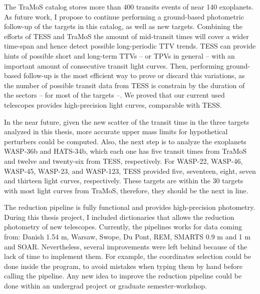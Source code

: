 The TraMoS catalog stores more than 400 transits events of near 140 exoplanets. As future work, I propose to continue performing a ground-based photometric follow-up of the targets in this catalog, as well as new targets.  Combining the efforts of TESS and TraMoS the amount of mid-transit times will cover a wider time-span and hence detect possible long-periodic TTV trends. TESS can provide hints of possible short and long-term TTVs -- or TPVs in general -- with an important amount of consecutive transit light curves. Then, performing ground-based follow-up is the most efficient way to prove or discard this variations, as the number of possible transit data from TESS is constrain by the duration of the sectors -- for most of the targets --. We proved that our current used telescopes provides high-precision light curves, comparable with TESS.


In the near future, given the new scatter of the transit time in the three targets analyzed in this thesis, more accurate upper mass limits for hypothetical perturbers could be computed. Also, the next step is to analyze the exoplanets WASP-36b and HATS-34b, which each one has five transit times from TraMoS and twelve and twenty-six from TESS, respectively. For WASP-22, WASP-46, WASP-45, WASP-23, and WASP-123, TESS provided five, seventeen, eight, seven and thirteen light curves, respectively. These targets are within the 30 targets with most light curves from TraMoS, therefore, they should be the next in line.

The reduction pipeline is fully functional and provides high-precision photometry. During this thesis project, I included dictionaries that allows the reduction photometry of new telescopes. Currently, the pipelines works for data coming from: Danish 1.54 m, Warsaw, Swope, Du Pont, REM, SMARTS 0.9 m and 1 m and SOAR. Nevertheless, several improvements were left behind because of the lack of time to implement them. For example, the coordinates selection could be done inside the program, to avoid mistakes when typing them by hand before calling the pipeline. Any new idea to improve the reduction pipeline could be done within an undergrad project or graduate semester-workshop.